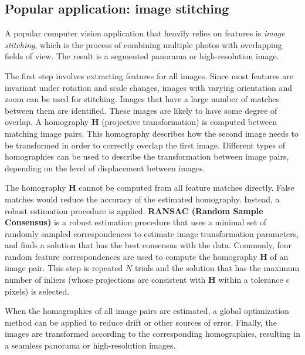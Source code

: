 \subsection{Popular application: image stitching}
A popular computer vision application that heavily relies on features is \textit{image stitching}, which is the process of combining multiple photos with overlapping fields of view.
The result is a segmented panorama or high-resolution image. 

The first step involves extracting features for all images.
Since most features are invariant under rotation and scale changes, images with varying orientation and zoom can be used for stitching.
Images that have a large number of matches between them are identified.
These images are likely to have some degree of overlap.
A homography $\boldsymbol{H}$ (projective transformation) is computed between matching image pairs.
This homography describes how the second image needs to be transformed in order to correctly overlap the first image.
Different types of homographies can be used to describe the transformation between image pairs, depending on the level of displacement between images.

The homography $\boldsymbol{H}$ cannot be computed from all feature matches directly.
False matches would reduce the accuracy of the estimated homography.
Instead, a robust estimation procedure is applied.
\textbf{RANSAC (Random Sample Consensus)} \cite{fischler1981random} is a robust estimation procedure that uses a minimal set of randomly sampled correspondences to estimate image transformation parameters, and finds a solution that has the best consensus with the data.
Commonly, four random feature correspondences are used to compute the homography $\boldsymbol{H}$ of an image pair.
This step is repeated $N$ trials and the solution that has the maximum number of inliers (whose projections are consistent with $\boldsymbol{H}$ within a tolerance $\epsilon$ pixels) is selected.

When the homographies of all image pairs are estimated, a global optimization method can be applied to reduce drift or other sources of error.
Finally, the images are transformed according to the corresponding homographies, resulting in a seamless panorama or high-resolution images. 



